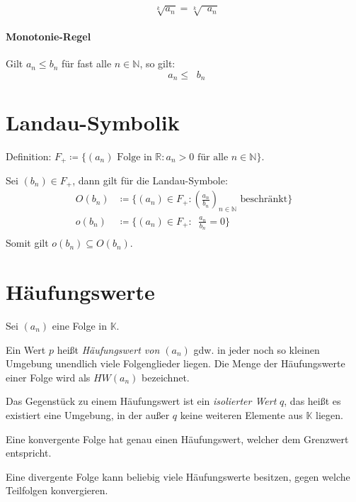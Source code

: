 \documentclass[a4paper, 11pt, accentcolor = tud3b]{tudreport}
\DeclareMathOperator{\liminfty}{\lim _ { n \rightarrow \infty }}
\begin{document}
                \[ \liminfty \sqrt[k]{a _ n} = \sqrt[k]{\liminfty a _ n} \]

            \paragraph{Monotonie-Regel}
                Gilt $ a _ n \leq b _ n $ für fast alle $ n \in \mathbb{N} $, so gilt: \[ \liminfty a _ n \leq \liminfty b _ n \]

        \section{Landau-Symbolik}
            Definition: $ F _ + \coloneqq \{ (a _ n) \text{ Folge in } \mathbb{R} : a _ n > 0 \text{ für alle } n \in \mathbb{N} \} $.

            Sei $ (b _ n) \in F _ + $, dann gilt für die Landau-Symbole:
            \begin{align*}
                O(b _ n) &\coloneqq \{ (a _ n) \in F _ + : (\frac{a _ n}{b _ n}) _ { n \in \mathbb{N} } \text{ beschränkt} \} \tag{Groß-O von $ b _ n $} \\
                o(b _ n) &\coloneqq \{ (a _ n) \in F _ + : \liminfty \frac{a _ n}{b _ n} = 0 \} \tag{Klein-O von $ b _ n $} \\
            \end{align*}
            Somit gilt $ o(b _ n) \subseteq O(b _ n) $.

        \section{Häufungswerte}
            Sei $ (a _ n) $ eine Folge in $ \mathbb{K} $.

            Ein Wert $ p $ heißt \textit{Häufungswert von $ (a _ n) $} gdw. in jeder noch so kleinen Umgebung unendlich viele Folgenglieder liegen. Die Menge der Häufungswerte einer Folge wird als $ HW(a _ n) $ bezeichnet.

            Das Gegenstück zu einem Häufungswert ist ein \textit{isolierter Wert} $ q $, das heißt es existiert eine Umgebung, in der außer $ q $ keine weiteren Elemente aus $ \mathbb{K} $ liegen.

            Eine konvergente Folge hat genau einen Häufungswert, welcher dem Grenzwert entspricht.

            Eine divergente Folge kann beliebig viele Häufungswerte besitzen, gegen welche Teilfolgen konvergieren.
\end{document}
